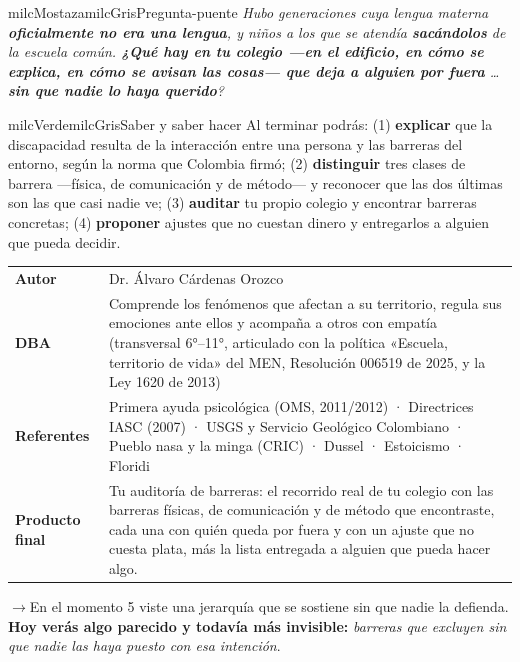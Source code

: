 \documentclass[11pt,letterpaper]{article}
\newcommand{\puente}[1]{%
  \begin{puentebox}%
    \textcolor{milcGradeDark}{$\rightarrow$}\hspace{2mm}#1%
  \end{puentebox}%
}
\begin{document}
\begin{softbox}{milcMostaza}{milcGris}{Pregunta-puente}
\textit{Hubo generaciones cuya lengua materna \textbf{oficialmente no era una lengua}, y niños a los que se atendía \textbf{sacándolos} de la escuela común. \textbf{¿Qué hay en tu colegio ---en el edificio, en cómo se explica, en cómo se avisan las cosas--- que deja a alguien por fuera} \ldots \textbf{sin que nadie lo haya querido}?}
\end{softbox}

\begin{softbox}{milcVerde}{milcGris}{Saber y saber hacer}
Al terminar podrás: (1) \textbf{explicar} que la discapacidad resulta de la interacción entre una persona y las barreras del entorno, según la norma que Colombia firmó; (2) \textbf{distinguir} tres clases de barrera ---física, de comunicación y de método--- y reconocer que las dos últimas son las que casi nadie ve; (3) \textbf{auditar} tu propio colegio y encontrar barreras concretas; (4) \textbf{proponer} ajustes que no cuestan dinero y entregarlos a alguien que pueda decidir.
\end{softbox}



\small
\begin{tabularx}{\textwidth}{>{\bfseries}p{3.0cm}Y}
Autor & Dr. Álvaro Cárdenas Orozco\\
DBA & Comprende los fenómenos que afectan a su territorio, regula sus emociones ante ellos y acompaña a otros con empatía (transversal 6°--11°, articulado con la política «Escuela, territorio de vida» del MEN, Resolución 006519 de 2025, y la Ley 1620 de 2013)\\
Referentes & Primera ayuda psicológica (OMS, 2011/2012) · Directrices IASC (2007) · USGS y Servicio Geológico Colombiano · Pueblo nasa y la minga (CRIC) · Dussel · Estoicismo · Floridi\\
Producto final & Tu auditoría de barreras: el recorrido real de tu colegio con las barreras físicas, de comunicación y de método que encontraste, cada una con quién queda por fuera y con un ajuste que no cuesta plata, más la lista entregada a alguien que pueda hacer algo.\\
\end{tabularx}
\normalsize

\puente{En el momento 5 viste una jerarquía que se sostiene sin que nadie la defienda. \textbf{Hoy verás algo parecido y todavía más invisible:} \emph{barreras que excluyen sin que nadie las haya puesto con esa intención}.}
\end{document}
